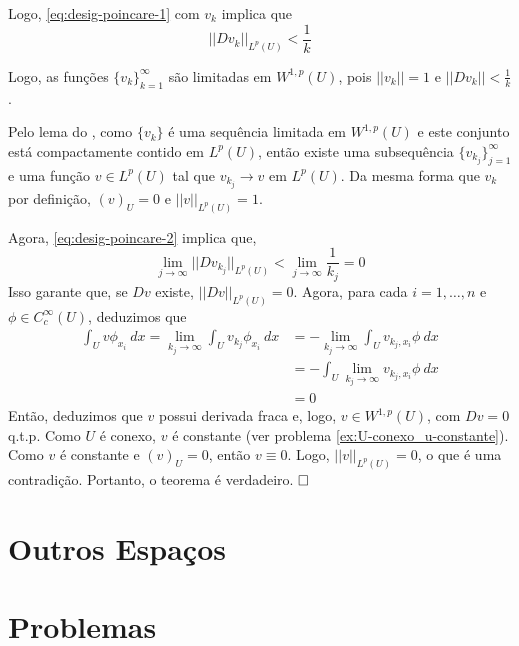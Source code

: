 \documentclass[11pt]{article}
\newcommand{\qed}{$\hfill\square$}
\begin{document}
Logo, \eqref{eq:desig-poincare-1} com $v_k$ implica que \begin{equation}\label{eq:desig-poincare-2}
	|| Dv_k||_{L^p(U)} < \frac{1}{k}
\end{equation}

Logo, as funções $\{v_k\}_{k=1}^\infty$ são limitadas em $W^{1,p}(U)$, pois $||v_k||=1$ e $||Dv_k||<\frac{1}{k}$. 

Pelo lema do , como $\{v_k\}$ é uma sequência limitada em $W^{1,p}(U)$ e este conjunto está compactamente contido em $L^p(U)$, então existe uma subsequência $\{v_{k_j}\}_{j=1}^\infty$ e uma função $v \in L^p(U)$ tal que $v_{k_j}\rightarrow v \text{ em } L^p(U)$. Da mesma forma que $v_k$ por definição, $(v)_U=0$ e $||v||_{L^p(U)}=1$.

Agora, \eqref{eq:desig-poincare-2} implica que, \begin{equation*}
	\lim_{j\rightarrow\infty} ||Dv_{k_j}||_{L^p(U)} < \lim_{j\rightarrow\infty} \frac{1}{k_j} = 0
\end{equation*} Isso garante que, se $Dv$ existe, $||Dv||_{L^p(U)}=0$. Agora, para cada $i=1,\ldots,n$ e $\phi \in C^\infty_c(U)$, deduzimos que \begin{align*}
\int_U v \phi_{x_i}\ dx = \lim_{k_j \rightarrow \infty} \int_U v_{k_j} \phi_{x_i}\ dx &= - \lim_{k_j \rightarrow \infty } \int_U v_{k_j,x_i} \phi \ dx \\ 
&=  -  \int_U \lim_{k_j \rightarrow \infty } v_{k_j,x_i} \phi \ dx \\
&= 0 \end{align*} 
Então, deduzimos que $v$ possui derivada fraca e, logo, $v \in W^{1,p}(U)$, com $Dv=0$ q.t.p. Como $U$ é conexo, $v$ é constante (ver problema \ref{ex:U-conexo_u-constante}). Como $v$ é constante e $(v)_U=0$, então $v \equiv 0$. Logo, $||v||_{L^p(U)}=0$, o que é uma contradição. Portanto, o teorema é verdadeiro. \qed


\section{Outros Espaços}

\section{Problemas}
\end{document}
